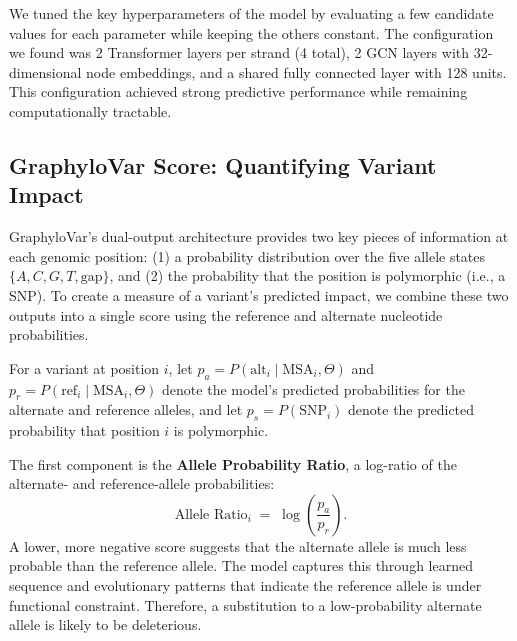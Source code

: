 \documentclass[unnumsec,webpdf,contemporary,large]{oup-authoring-template}%
\theoremstyle{thmstyleone}%
\theoremstyle{thmstyletwo}%
\theoremstyle{thmstylethree}%
\begin{document}


We tuned the key hyperparameters of the model by evaluating a few candidate values for each parameter while keeping the others constant. The configuration we found was 2 Transformer layers per strand (4 total), 2 GCN layers with 32-dimensional node embeddings, and a shared fully connected layer with 128 units. This configuration achieved strong predictive performance while remaining computationally tractable.


\subsection{GraphyloVar Score: Quantifying Variant Impact}

GraphyloVar's dual-output architecture provides two key pieces of information at each genomic position: (1) a probability distribution over the five allele states \(\{A, C, G, T, \text{gap}\}\), and (2) the probability that the position is polymorphic (i.e., a SNP). To create a measure of a variant's predicted impact, we combine these two outputs into a single score using the reference and alternate nucleotide probabilities.

For a variant at position \(i\), let \(p_a = P(\text{alt}_i \mid \text{MSA}_i, \Theta)\) and \(p_r = P(\text{ref}_i \mid \text{MSA}_i, \Theta)\) denote the model's predicted probabilities for the alternate and reference alleles, and let \(p_s = P(\text{SNP}_i)\) denote the predicted probability that position \(i\) is polymorphic.

The first component is the \textbf{Allele Probability Ratio}, a log-ratio of the alternate- and reference-allele probabilities:
\begin{equation}
\text{Allele Ratio}_i \;=\; \log\!\left(\frac{p_a}{p_r}\right).
\end{equation}
A lower, more negative score suggests that the alternate allele is much less probable than the reference allele. The model captures this through learned sequence and evolutionary patterns that indicate the reference allele is under functional constraint. Therefore, a substitution to a low-probability alternate allele is likely to be deleterious.
\end{document}
